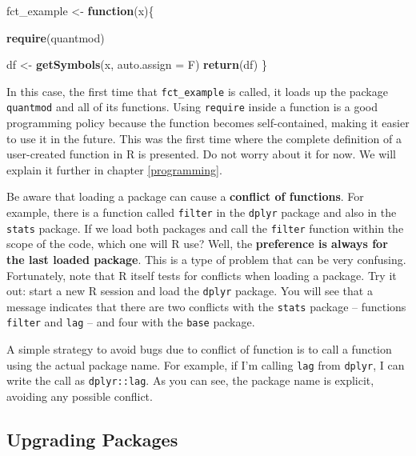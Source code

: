 \documentclass[
  12pt,
]{book}
\newenvironment{Shaded}{\begin{snugshade}}{\end{snugshade}}
\newcommand{\ControlFlowTok}[1]{\textcolor[rgb]{0.27,0.27,0.27}{\textbf{#1}}}
\newcommand{\DataTypeTok}[1]{\textcolor[rgb]{0.27,0.27,0.27}{#1}}
\newcommand{\KeywordTok}[1]{\textcolor[rgb]{0.27,0.27,0.27}{\textbf{#1}}}
\newcommand{\NormalTok}[1]{#1}
\newcommand{\StringTok}[1]{\textcolor[rgb]{0.5,0.5,0.5}{#1}}
\newenvironment{rmdcaution}
{\begin{cautionblock}
		
	} {\end{cautionblock}}
\begin{document}
\begin{Shaded}
\begin{Highlighting}[]
\NormalTok{fct_example <-}\StringTok{ }\ControlFlowTok{function}\NormalTok{(x)\{}

  \KeywordTok{require}\NormalTok{(quantmod)}

\NormalTok{    df <-}\StringTok{ }\KeywordTok{getSymbols}\NormalTok{(x, }\DataTypeTok{auto.assign =}\NormalTok{ F)}
    \KeywordTok{return}\NormalTok{(df)}
\NormalTok{\}}
\end{Highlighting}
\end{Shaded}

In this case, the first time that \texttt{fct\_example} is called, it loads up the package \texttt{quantmod} and all of its functions. Using \texttt{require} inside a function is a good programming policy because the function becomes self-contained, making it easier to use it in the future. This was the first time where the complete definition of a user-created function in R is presented. Do not worry about it for now. We will explain it further in chapter \ref{programming}.

\begin{rmdcaution}
Be aware that loading a package can cause a \textbf{conflict of
functions}. For example, there is a function called \texttt{filter} in
the \texttt{dplyr} package and also in the \texttt{stats} package. If we
load both packages and call the \texttt{filter} function within the
scope of the code, which one will R use? Well, the \textbf{preference is
always for the last loaded package}. This is a type of problem that can
be very confusing. Fortunately, note that R itself tests for conflicts
when loading a package. Try it out: start a new R session and load the
\texttt{dplyr} package. You will see that a message indicates that there
are two conflicts with the \texttt{stats} package -- functions
\texttt{filter} and \texttt{lag} -- and four with the \texttt{base}
package.

A simple strategy to avoid bugs due to conflict of function is to call a
function using the actual package name. For example, if I'm calling
\texttt{lag} from \texttt{dplyr}, I can write the call as
\texttt{dplyr::lag}. As you can see, the package name is explicit,
avoiding any possible conflict.
\end{rmdcaution}

\hypertarget{upgrading-packages}{%
\subsection{Upgrading Packages}\label{upgrading-packages}}
\end{document}
